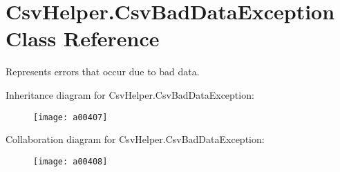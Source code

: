 \hypertarget{a00053}{\section{Csv\-Helper.\-Csv\-Bad\-Data\-Exception Class Reference}
\label{a00053}
}


Represents errors that occur due to bad data.  




Inheritance diagram for Csv\-Helper.\-Csv\-Bad\-Data\-Exception\-:
\nopagebreak
\begin{figure}[H]
\begin{center}
\leavevmode
\texttt{[image: a00407]}
\end{center}
\end{figure}


Collaboration diagram for Csv\-Helper.\-Csv\-Bad\-Data\-Exception\-:
\nopagebreak
\begin{figure}[H]
\begin{center}
\leavevmode
\texttt{[image: a00408]}
\end{center}
\end{figure}
